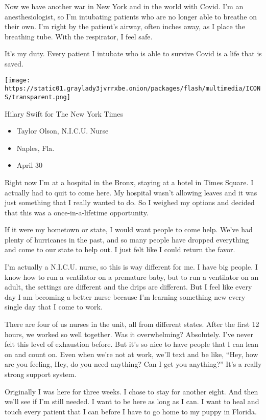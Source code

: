 Now we have another war in New York and in the world with Covid. I'm an
anesthesiologist, so I'm intubating patients who are no longer able to
breathe on their own. I'm right by the patient's airway, often inches
away, as I place the breathing tube. With the respirator, I feel safe.

It's my duty. Every patient I intubate who is able to survive Covid is a
life that is saved.

\texttt{[image: https://static01.graylady3jvrrxbe.onion/packages/flash/multimedia/ICONS/transparent.png]}

Hilary Swift for The New York Times

\begin{itemize}
\tightlist
\item
  Taylor Olson, N.I.C.U. Nurse
\item
  Naples, Fla.
\item
  April 30
\end{itemize}

Right now I'm at a hospital in the Bronx, staying at a hotel in Times
Square. I actually had to quit to come here. My hospital wasn't allowing
leaves and it was just something that I really wanted to do. So I
weighed my options and decided that this was a once-in-a-lifetime
opportunity.

If it were my hometown or state, I would want people to come help. We've
had plenty of hurricanes in the past, and so many people have dropped
everything and come to our state to help out. I just felt like I could
return the favor.

I'm actually a N.I.C.U. nurse, so this is way different for me. I have
big people. I know how to run a ventilator on a premature baby, but to
run a ventilator on an adult, the settings are different and the drips
are different. But I feel like every day I am becoming a better nurse
because I'm learning something new every single day that I come to work.

There are four of us nurses in the unit, all from different states.
After the first 12 hours, we worked so well together. Was it
overwhelming? Absolutely. I've never felt this level of exhaustion
before. But it's so nice to have people that I can lean on and count on.
Even when we're not at work, we'll text and be like, ``Hey, how are you
feeling, Hey, do you need anything? Can I get you anything?'' It's a
really strong support system.

Originally I was here for three weeks. I chose to stay for another
eight. And then we'll see if I'm still needed. I want to be here as long
as I can. I want to heal and touch every patient that I can before I
have to go home to my puppy in Florida.

